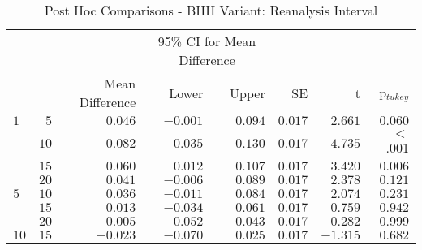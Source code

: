 \begin{table}[htb]
	\centering
	\caption{Post Hoc Comparisons - BHH Variant: Reanalysis Interval}
	\label{tab:results:reanalysis:post_hoc}%
	\par\bigskip
	\resizebox{\textwidth}{!}
	{
		\begin{tabular}{lrrrrrrr}
			\toprule
			\multicolumn{1}{c}{} & \multicolumn{1}{c}{} & \multicolumn{1}{c}{} & \multicolumn{2}{c}{95\% CI for Mean Difference} & \multicolumn{1}{c}{} & \multicolumn{1}{c}{} & \multicolumn{1}{c}{}               \\
			\cline{4-5}
			$ $                  & $ $                  & Mean Difference      & Lower                                           & Upper                & SE                   & t                    & p$_{tukey}$ \\
			\cmidrule[0.4pt]{1-8}
			$1$                  & $5$                  & $0.046$              & $-0.001$                                        & $0.094$              & $0.017$              & $2.661$              & $0.060$     \\
			$ $                  & $10$                 & $0.082$              & $0.035$                                         & $0.130$              & $0.017$              & $4.735$              & $<$ .001    \\
			                     & $15$                 & $0.060$              & $0.012$                                         & $0.107$              & $0.017$              & $3.420$              & $0.006$     \\
			                     & $20$                 & $0.041$              & $-0.006$                                        & $0.089$              & $0.017$              & $2.378$              & $0.121$     \\
			$5$                  & $10$                 & $0.036$              & $-0.011$                                        & $0.084$              & $0.017$              & $2.074$              & $0.231$     \\
			$ $                  & $15$                 & $0.013$              & $-0.034$                                        & $0.061$              & $0.017$              & $0.759$              & $0.942$     \\
			                     & $20$                 & $-0.005$             & $-0.052$                                        & $0.043$              & $0.017$              & $-0.282$             & $0.999$     \\
			$10$                 & $15$                 & $-0.023$             & $-0.070$                                        & $0.025$              & $0.017$              & $-1.315$             & $0.682$     \\

\end{tabular}}
\end{table}
